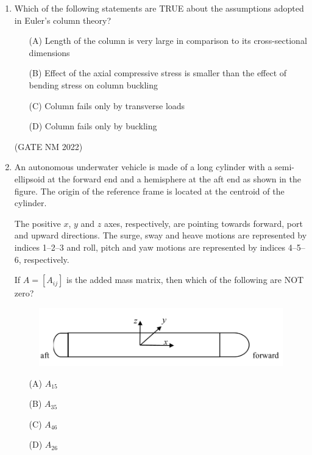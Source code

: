 \documentclass[journal,12pt,onecolumn]{IEEEtran}
\theoremstyle{remark}
\begin{document}
\begin{enumerate}
\item  Which of the following statements are TRUE about the assumptions adopted in Euler's column theory?  

\begin{enumerate}
    \item[(A)] Length of the column is very large in comparison to its cross-sectional dimensions
    \item[(B)] Effect of the axial compressive stress is smaller than the effect of bending stress on column buckling
    \item[(C)] Column fails only by transverse loads
    \item[(D)] Column fails only by buckling
\end{enumerate}

\hfill(GATE NM 2022)


\item  An autonomous underwater vehicle is made of a long cylinder with a semi-ellipsoid at the forward end and a hemisphere at the aft end as shown in the figure.  
The origin of the reference frame is located at the centroid of the cylinder.  

The positive $x$, $y$ and $z$ axes, respectively, are pointing towards forward, port and upward directions.  
The surge, sway and heave motions are represented by indices 1--2--3 and roll, pitch and yaw motions are represented by indices 4--5--6, respectively.  

If $A = [A_{ij}]$ is the added mass matrix, then which of the following are NOT zero?

\begin{figure}[h]
	\centering
	\includegraphics[width=0.6\columnwidth]{fig6}
	\caption{}
	\label{fig:placeholder}
\end{figure}

\begin{multicols}{4}

\begin{enumerate}
    \item[(A)]  $A_{15}$
    \item[(B)]  $A_{35}$
    \item[(C)]  $A_{46}$
    \item[(D)]  $A_{26}$
\end{enumerate}


\end{multicols}
\end{enumerate}
\end{document}
